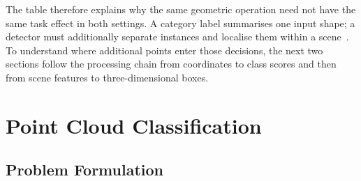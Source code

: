 The table therefore explains why the same geometric operation need not have
the same task effect in both settings. A category label summarises one input shape;
a detector must additionally separate instances and localise them within a
scene~\cite{shi2019pointrcnn,qi2017pointnet}. To understand where additional
points enter those decisions, the next two sections follow the processing
chain from coordinates to class scores and then from scene features to
three-dimensional boxes.

\FloatBarrier
\section{Point Cloud Classification}
\label{sec:classification}

\subsection{Problem Formulation}
\label{subsec:cls_formulation}

